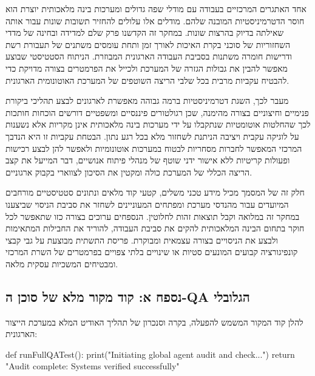 \documentclass{hebrew-academic-template}
\begin{document}
אחד האתגרים המרכזיים בעבודה עם מודלי שפה גדולים ומערכות בינה מלאכותית יוצרת הוא חוסר הדטרמיניסטיות המובנה שלהם. מודלים אלו עלולים להחזיר תשובות שונות עבור אותה שאילתה בדיוק בהרצות שונות. במחקר זה הקדשנו פרק שלם למדידה ובחינה של מדדי השחזוריות של סוכני בקרת האיכות לאורך זמן ותחת עומסים משתנים של תעבורת רשת ודרישות חומרה משתנות בסביבת העבודה הארגונית המבוזרת. הניתוח הסטטיסטי שבוצע מאפשר להבין את גבולות הגזרה של המערכת ולכייל את הפרמטרים בצורה מדויקת כדי להבטיח עקביות מרבית בכל שלבי הריצה השוטפים של המערכת האוטונומית הארגונית.

מעבר לכך, השגת דטרמיניסטיות ברמה גבוהה מאפשרת לארגונים לבצע תהליכי ביקורת פנימיים וחיצוניים בצורה מהימנה, שכן רגולטורים פיננסיים ומשפטיים דורשים הוכחות חותכות לכך שהחלטות אוטומטיות שנתקבלו על ידי מערכות בינה מלאכותית אינן מקריות אלא נשענות על לוגיקה עקבית ויציבה הניתנת לשחזור מלא בכל רגע נתון. הבטחת עקביות זו היא הנדבך המרכזי המאפשר לחברות מסחריות לבטוח במערכות אוטונומיות ולאפשר להן לבצע רכישות ופעולות קריטיות ללא אישור ידני שוטף של מנהלי פיתוח אנושיים, דבר המייעל את קצב הריצה הכללי של המערכת כולה ומקטין את הסיכון לצווארי בקבוק ארגוניים.

\newpage
{}
חלק זה של המסמך מכיל מידע טכני משלים, קטעי קוד מלאים ונתונים סטטיסטיים מורחבים המיועדים עבור מהנדסי מערכת ומפתחים המעוניינים לשחזר את סביבת הניסוי שביצענו במחקר זה במלואה וקבל תוצאות זהות לחלוטין. הנספחים ערוכים בצורה כזו שתאפשר לכל חוקר בתחום הבינה המלאכותית להקים את סביבת העבודה, להוריד את החבילות המתאימות ולבצע את הניסויים בצורה עצמאית ומבוקרת. פריסת התשתית מבוצעת על גבי קבצי קונפיגורציה קבועים המונעים סטיות או שינויים בלתי צפויים בפרמטרים של השרת המרכזי ומבטיחים המשכיות עסקית מלאה.

\subsection{נספח א: קוד מקור מלא של סוכן ה-QA הגלובלי}
להלן קוד המקור המשמש להפעלה, בקרה וסנכרון של תהליך האודיט המלא במערכת הייצור הארגונית:
\begin{pythonbox}
def runFullQATest():
    print("Initiating global agent audit and check...")
    return "Audit complete: Systems verified successfully"
\end{pythonbox}
\end{document}
